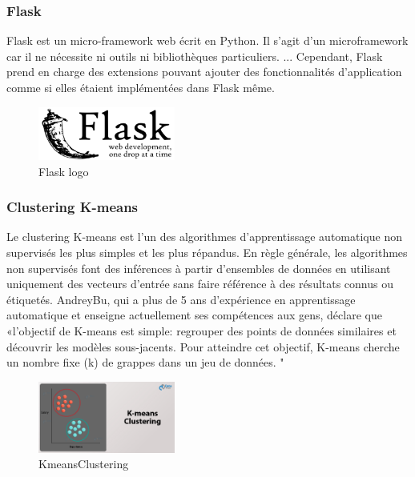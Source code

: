 \subsubsection*{Flask}
Flask est un micro-framework web écrit en Python. Il s’agit d’un microframework car il ne nécessite ni outils ni bibliothèques particuliers. ... Cependant, Flask prend en charge des extensions pouvant ajouter des fonctionnalités d'application comme si elles étaient implémentées dans Flask même.
\begin{figure}[!ht]\centering
\includegraphics[width=0.4\textwidth]{chapitres/chapitre7/figures/flask.png}
\caption{Flask logo }
\label{fig:flask}
\end{figure}


\subsubsection*{Clustering K-means}

Le clustering K-means est l'un des algorithmes d'apprentissage automatique non supervisés les plus simples et les plus répandus.
En règle générale, les algorithmes non supervisés font des inférences à partir d'ensembles de données en utilisant uniquement des vecteurs d'entrée sans faire référence à des résultats connus ou étiquetés.
AndreyBu, qui a plus de 5 ans d'expérience en apprentissage automatique et enseigne actuellement ses compétences aux gens, déclare que «l'objectif de K-means est simple: regrouper des points de données similaires et découvrir les modèles sous-jacents. Pour atteindre cet objectif, K-means cherche un nombre fixe (k) de grappes dans un jeu de données. "
\begin{figure}[!ht]\centering
\includegraphics[width=0.4\textwidth]{chapitres/chapitre7/figures/KmeansClustering.jpg}
\caption{KmeansClustering }
\label{fig:KmeansClustering}
\end{figure}
